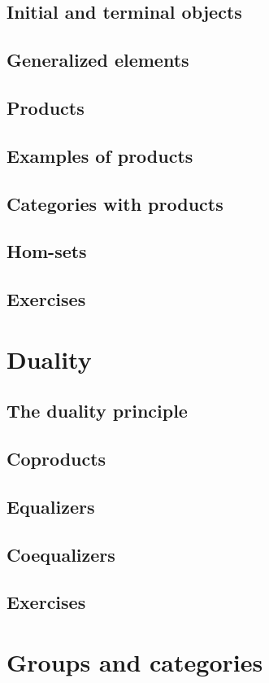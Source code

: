 \documentclass[uplatex, 12pt, dvipdfmx]{jsarticle}
\begin{document}
\subsection{Initial and terminal objects}
\subsection{Generalized elements}
\subsection{Products}
\subsection{Examples of products}
\subsection{Categories with products}
\subsection{Hom-sets}
\subsection{Exercises}

\section{Duality}

\subsection{The duality principle}
\subsection{Coproducts}
\subsection{Equalizers}
\subsection{Coequalizers}
\subsection{Exercises}

\section{Groups and categories}
\end{document}

